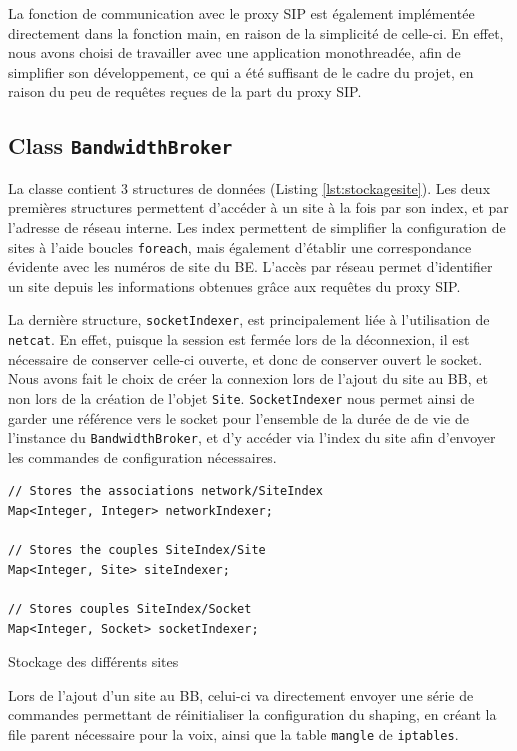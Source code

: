 \documentclass[a4paper,11pt]{article}
\let\Oldsubsection\subsection
\renewcommand{\subsection}{\FloatBarrier\Oldsubsection}
\begin{document}
La fonction de communication avec le proxy SIP est également implémentée directement dans la fonction main, en raison de la simplicité de celle-ci. En effet, nous avons choisi de travailler avec une application monothreadée,  afin de simplifier son développement, ce qui a été suffisant de le cadre du projet, en raison du peu de requêtes reçues de la part du proxy SIP.

\subsection{Class \texttt{BandwidthBroker}}

La classe contient 3 structures de données (Listing \ref{lst:stockagesite}). Les deux premières structures permettent d'accéder à un site à la fois par son index, et par l'adresse de réseau interne. Les index permettent de simplifier la configuration de sites  à l'aide boucles \texttt{foreach}, mais également d'établir une correspondance évidente avec les numéros de site du BE.
L'accès par réseau permet d'identifier un site depuis les informations obtenues grâce aux requêtes du proxy SIP.

La dernière structure, \texttt{socketIndexer}, est principalement liée à l'utilisation de \texttt{netcat}. En effet, puisque la session est fermée lors de la déconnexion, il est nécessaire de conserver celle-ci ouverte, et donc de conserver ouvert le socket. 
Nous avons fait le choix de créer la connexion lors de l'ajout du site au BB, et non lors de la création de l'objet \texttt{Site}. \texttt{SocketIndexer} nous permet ainsi de garder une référence vers le socket pour l'ensemble de la durée de de vie de l'instance du \texttt{BandwidthBroker}, et d'y accéder via l'index du site afin d'envoyer les commandes de configuration nécessaires.


\begin{listing}[htp]
    \begin{verbatim}
// Stores the associations network/SiteIndex
Map<Integer, Integer> networkIndexer;

// Stores the couples SiteIndex/Site
Map<Integer, Site> siteIndexer;

// Stores couples SiteIndex/Socket
Map<Integer, Socket> socketIndexer;
      \end{verbatim}
    \caption{Stockage des différents sites}
    \label{lst:stockagesite}
\end{listing}

Lors de l'ajout d'un site au BB, celui-ci va directement envoyer une série de commandes permettant de réinitialiser la configuration du shaping, en créant la file parent nécessaire pour la voix, ainsi que la table \texttt{mangle} de \texttt{iptables}.
\end{document}
